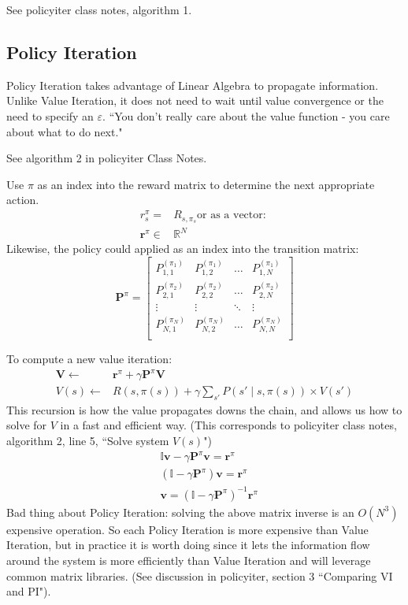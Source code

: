 \documentclass[11pt, oneside]{article}   	%
\begin{document}
See policyiter class notes, algorithm 1.

\subsection{Policy Iteration}

Policy Iteration takes advantage of Linear Algebra to propagate information. Unlike Value Iteration, it does not need to wait until value convergence or the need to specify an $\varepsilon$. ``You don't really care about the value function - you care about what to do next."

See algorithm 2 in policyiter Class Notes.

Use $\pi$ as an index into the reward matrix to determine the next appropriate action.
\begin{align}
r_s^\pi = & R_{s,\pi_s}  \text{or as a vector:  } \\
\mathbf{r}^\pi \in & \mathbb{R}^N
\end{align}
Likewise, the policy could applied as an index into the transition matrix:
\[
\mathbf{P}^\pi = \begin{bmatrix}
P_{1,1}^{(\pi_1)}  & P_{1,2}^{(\pi_1)} & \ldots & P_{1,N}^{(\pi_1)}\\[0.3em]
P_{2,1}^{(\pi_2)}  & P_{2,2}^{(\pi_2)} & \ldots & P_{2,N}^{(\pi_2)}\\[0.3em]
\vdots                   &          \vdots        & \ddots & \vdots \\
P_{N,1}^{(\pi_N)}  & P_{N,2}^{(\pi_N)} & \ldots & P_{N,N}^{(\pi_N)}\\[0.3em]
\end{bmatrix}
\]

To compute a new value iteration:
\begin{align}
\mathbf{V} \leftarrow & \mathbf{r}^\pi + \gamma \mathbf{P}^\pi \mathbf{V}\\
V(s) \leftarrow  & R(s,\pi(s)) + \gamma \sum_{s'} P(s' \mid s, \pi(s)) \times V(s')
\end{align}
This recursion is how the value propagates downs the chain, and allows us how to solve for $V$ in a fast and efficient way.
(This corresponds to policyiter class notes, algorithm 2, line 5, ``Solve system $V(s)$")
\begin{align}
&\mathbb{I} \mathbf{v} - \gamma \mathbf{P}^\pi\mathbf{v} = \mathbf{r}^\pi \\
&(\mathbb{I} - \gamma \mathbf{P}^\pi)\mathbf{v} = \mathbf{r}^\pi \\
&\mathbf{v} =  (\mathbb{I} - \gamma \mathbf{P}^\pi)^{-1}\mathbf{r}^\pi
\end{align}
Bad thing about Policy Iteration: solving the above matrix inverse is an $O(N^3)$ expensive operation. So each Policy Iteration is more expensive than Value Iteration, but in practice it is worth doing since it lets the information flow around the system is more efficiently than Value Iteration and will leverage common matrix libraries. (See discussion in policyiter, section 3 ``Comparing VI and PI").
\end{document}
